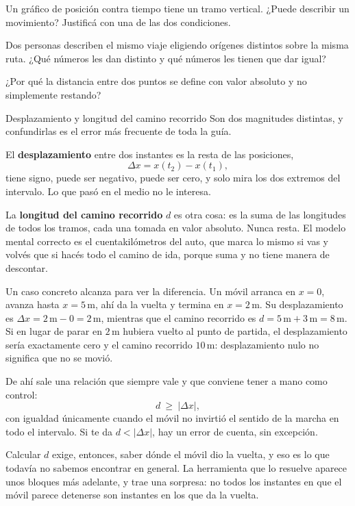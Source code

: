 \documentclass[11pt,openany]{book}
\begin{document}
\begin{chequeo}
\item Un gráfico de posición contra tiempo tiene un tramo vertical. ¿Puede describir un movimiento? Justificá con una de las dos condiciones.
\item Dos personas describen el mismo viaje eligiendo orígenes distintos sobre la misma ruta. ¿Qué números les dan distinto y qué números les tienen que dar igual?
\item ¿Por qué la distancia entre dos puntos se define con valor absoluto y no simplemente restando?
\end{chequeo}

\begin{bloque}{Desplazamiento y longitud del camino recorrido}
Son dos magnitudes distintas, y confundirlas es el error más frecuente de toda la guía.

El \textbf{desplazamiento} entre dos instantes es la resta de las posiciones,
\[
\Delta x = x(t_2) - x(t_1),
\]
tiene signo, puede ser negativo, puede ser cero, y solo mira los dos extremos del intervalo. Lo que pasó en el medio no le interesa.

La \textbf{longitud del camino recorrido} $d$ es otra cosa: es la suma de las longitudes de todos los tramos, cada una tomada en valor absoluto. Nunca resta. El modelo mental correcto es el cuentakilómetros del auto, que marca lo mismo si vas y volvés que si hacés todo el camino de ida, porque suma y no tiene manera de descontar.

Un caso concreto alcanza para ver la diferencia. Un móvil arranca en $x=0$, avanza hasta $x=5\,\mathrm{m}$, ahí da la vuelta y termina en $x=2\,\mathrm{m}$. Su desplazamiento es $\Delta x = 2\,\mathrm{m} - 0 = 2\,\mathrm{m}$, mientras que el camino recorrido es $d = 5\,\mathrm{m} + 3\,\mathrm{m} = 8\,\mathrm{m}$. Si en lugar de parar en $2\,\mathrm{m}$ hubiera vuelto al punto de partida, el desplazamiento sería exactamente cero y el camino recorrido $10\,\mathrm{m}$: desplazamiento nulo no significa que no se movió.

De ahí sale una relación que siempre vale y que conviene tener a mano como control:
\[
d \ \ge\ \lvert \Delta x\rvert,
\]
con igualdad únicamente cuando el móvil no invirtió el sentido de la marcha en todo el intervalo. Si te da $d < \lvert\Delta x\rvert$, hay un error de cuenta, sin excepción.

Calcular $d$ exige, entonces, saber dónde el móvil dio la vuelta, y eso es lo que todavía no sabemos encontrar en general. La herramienta que lo resuelve aparece unos bloques más adelante, y trae una sorpresa: no todos los instantes en que el móvil parece detenerse son instantes en los que da la vuelta.


\end{bloque}
\end{document}
